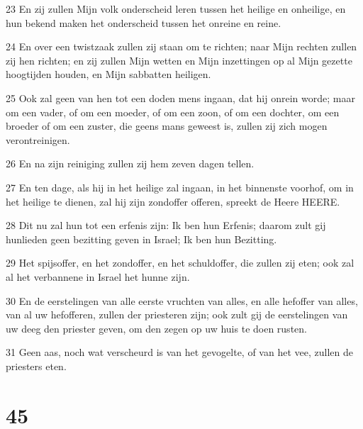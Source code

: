 \par 23 En zij zullen Mijn volk onderscheid leren tussen het heilige en onheilige, en hun bekend maken het onderscheid tussen het onreine en reine.
\par 24 En over een twistzaak zullen zij staan om te richten; naar Mijn rechten zullen zij hen richten; en zij zullen Mijn wetten en Mijn inzettingen op al Mijn gezette hoogtijden houden, en Mijn sabbatten heiligen.
\par 25 Ook zal geen van hen tot een doden mens ingaan, dat hij onrein worde; maar om een vader, of om een moeder, of om een zoon, of om een dochter, om een broeder of om een zuster, die geens mans geweest is, zullen zij zich mogen verontreinigen.
\par 26 En na zijn reiniging zullen zij hem zeven dagen tellen.
\par 27 En ten dage, als hij in het heilige zal ingaan, in het binnenste voorhof, om in het heilige te dienen, zal hij zijn zondoffer offeren, spreekt de Heere HEERE.
\par 28 Dit nu zal hun tot een erfenis zijn: Ik ben hun Erfenis; daarom zult gij hunlieden geen bezitting geven in Israel; Ik ben hun Bezitting.
\par 29 Het spijsoffer, en het zondoffer, en het schuldoffer, die zullen zij eten; ook zal al het verbannene in Israel het hunne zijn.
\par 30 En de eerstelingen van alle eerste vruchten van alles, en alle hefoffer van alles, van al uw hefofferen, zullen der priesteren zijn; ook zult gij de eerstelingen van uw deeg den priester geven, om den zegen op uw huis te doen rusten.
\par 31 Geen aas, noch wat verscheurd is van het gevogelte, of van het vee, zullen de priesters eten.

\chapter{45}

